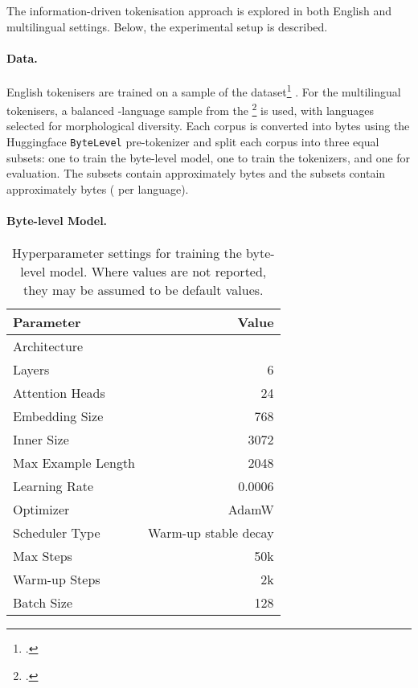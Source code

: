 The information-driven tokenisation approach is explored in both English and multilingual settings. Below, the experimental setup is described.

\paragraph{Data.} 
English tokenisers are trained on a sample of the \fineweb dataset\footnote{\href{https://huggingface.co/datasets/HuggingFaceFW/fineweb-edu}{}.} \citep{penedo2024finewebdatasetsdecantingweb}.
For the multilingual tokenisers, a balanced -language sample from the \commoncorpus \footnote{\href{https://huggingface.co/datasets/PleIAs/common_corpus}{}.} \citep{common_corpus} is used, with languages selected for morphological diversity. Each corpus is converted into bytes using the Huggingface \texttt{ByteLevel} pre-tokenizer and split each corpus into three equal subsets: one to train the byte-level model, one to train the tokenizers, and one for evaluation. The \fineweb subsets contain approximately  bytes and the \commoncorpus subsets contain approximately  bytes ( per language).

\paragraph{Byte-level Model.} 

\begin{table}[t]
    \centering
    \small
    \begin{tabular}{lr}
        \toprule
        Parameter & Value \\
        \midrule
        Architecture & \llama-2 \\
        Layers & 6 \\
        Attention Heads & 24 \\
        Embedding Size & 768 \\
        Inner Size & 3072 \\
        \midrule
        Max Example Length & 2048 \\
        Learning Rate & 0.0006 \\
        Optimizer & AdamW \\
        Scheduler Type & Warm-up stable decay \\
        Max Steps & 50k \\
        Warm-up Steps & 2k \\
        Batch Size & 128 \\
        \bottomrule
    \end{tabular}
    \caption{Hyperparameter settings for training the \llama byte-level model. Where values are not reported, they may be assumed to be default values.}
    \label{tab:16-trainingparams}
\end{table}

